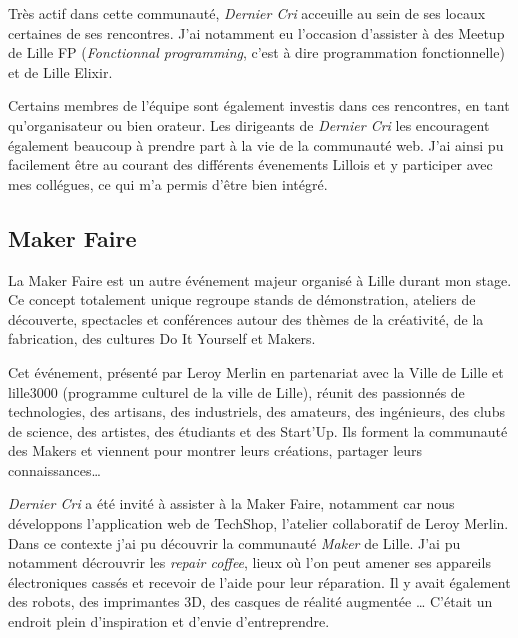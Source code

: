 \documentclass[12pt,a4paper]{article}
\begin{document}
  \bigskip

  Très actif dans cette communauté, \emph{Dernier Cri} acceuille au sein
  de ses locaux certaines de ses rencontres. J'ai notamment eu l'occasion
  d'assister à des Meetup de Lille FP (\emph{Fonctionnal programming},
  c'est à dire programmation fonctionnelle) et de Lille Elixir.

  \bigskip

  Certains membres de l'équipe sont également investis dans ces
  rencontres, en tant qu'organisateur ou bien orateur. Les dirigeants de
  \emph{Dernier Cri} les encouragent également beaucoup à prendre part à
  la vie de la communauté web. J'ai ainsi pu facilement être au courant
  des différents évenements Lillois et y participer avec mes collégues, ce
  qui m'a permis d'être bien intégré.

  \bigskip

  \subsection{Maker Faire}\label{maker-faire}

  \bigskip

  La Maker Faire est un autre événement majeur organisé à Lille durant mon
  stage. Ce concept totalement unique regroupe stands de démonstration,
  ateliers de découverte, spectacles et conférences autour des thèmes de
  la créativité, de la fabrication, des cultures Do It Yourself et Makers.

  \bigskip

  Cet événement, présenté par Leroy Merlin en partenariat avec la Ville de
  Lille et lille3000 (programme culturel de la ville de Lille), réunit des
  passionnés de technologies, des artisans, des industriels, des amateurs,
  des ingénieurs, des clubs de science, des artistes, des étudiants et des
  Start'Up. Ils forment la communauté des Makers et viennent pour montrer
  leurs créations, partager leurs connaissances\ldots{}

  \bigskip

  \emph{Dernier Cri} a été invité à assister à la Maker Faire, notamment
  car nous développons l'application web de TechShop, l'atelier
  collaboratif de Leroy Merlin. Dans ce contexte j'ai pu découvrir la
  communauté \emph{Maker} de Lille. J'ai pu notamment décrouvrir les
  \emph{repair coffee}, lieux où l'on peut amener ses appareils
  électroniques cassés et recevoir de l'aide pour leur réparation. Il y
  avait également des robots, des imprimantes 3D, des casques de réalité
  augmentée \ldots{} C'était un endroit plein d'inspiration et d'envie
  d'entreprendre.
\end{document}

